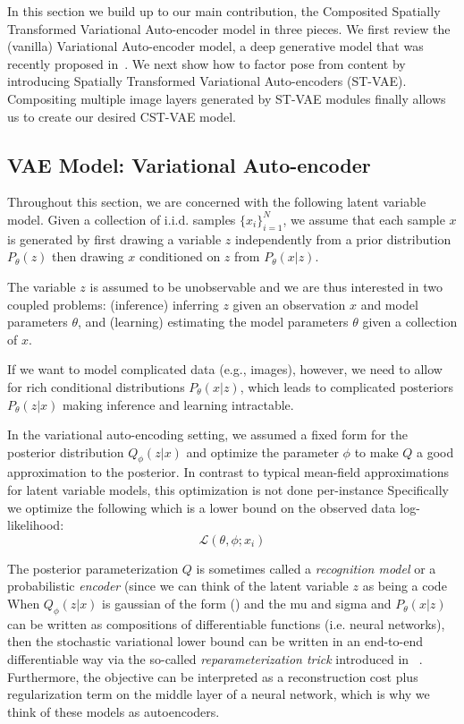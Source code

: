 

In this section we build up to our 
main contribution, the Composited Spatially Transformed Variational Auto-encoder model in three pieces. 
We first review the (vanilla) Variational Auto-encoder model, a deep generative model that
was recently proposed  in~\cite{Kingma2014}.  We next show how to factor pose from content
by introducing Spatially Transformed Variational Auto-encoders (ST-VAE).  Compositing multiple image layers generated
by ST-VAE modules 
finally allows us to create our desired CST-VAE model.



\subsection{{\bf VAE} Model: Variational Auto-encoder}\label{sec:vae}

Throughout this section, we are concerned with the following latent variable model.
Given a collection of i.i.d. samples $\{x_i\}_{i=1}^N$, we assume that each sample $x$
is generated by first drawing a variable $z$ independently from a prior distribution $P_\theta(z)$
then drawing $x$ conditioned on $z$ from $P_\theta(x|z)$.  %

The variable $z$ is assumed to be unobservable 
and we are thus interested in two coupled problems:
(inference) inferring $z$ given an observation $x$ and model parameters $\theta$, and 
(learning) estimating the model parameters $\theta$ given a collection of $x$.

If we want to model complicated data (e.g., images), however, we need to allow for rich conditional distributions
$P_\theta(x|z)$, which leads to complicated posteriors $P_\theta(z|x)$ making inference and learning intractable.

In the variational auto-encoding setting, we assumed a fixed form for the posterior distribution $Q_\phi(z|x)$ and optimize
the parameter $\phi$ to make $Q$ a good approximation to the posterior.  In contrast to typical mean-field approximations for latent variable models,
this optimization is not done per-instance    
Specifically we optimize the following 
which is a lower bound on the observed data log-likelihood:
\begin{equation}\label{eqn:vae_objective}
\mathcal{L}(\theta, \phi; x_i)
\end{equation}

The posterior parameterization $Q$ is sometimes called a \emph{recognition model} or a probabilistic \emph{encoder} (since we can
think of the latent variable $z$ as being a code
When $Q_\phi(z|x)$ is gaussian of the form () and  the mu and sigma and $P_\theta(x|z)$ can be written as
compositions of differentiable functions (i.e. neural networks), then the stochastic variational lower bound can be 
written in an end-to-end
differentiable way via the so-called \emph{reparameterization trick} introduced in ~\cite{Kingma2014}.
Furthermore, the objective can be interpreted as a reconstruction cost plus regularization term on the middle layer
of a neural network, which is why we think of these models as autoencoders.

